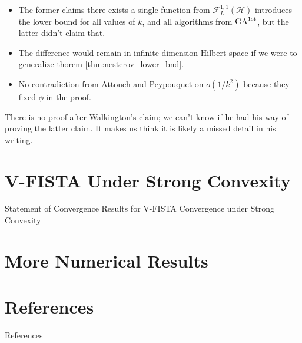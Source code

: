 \documentclass[11pt]{beamer}
\theoremstyle{definition}
\begin{document}
    \begin{frame}
        \begin{itemize}
            \item The former claims there exists a single function from $\mathcal F_{L}^{1,1}(\mathcal H)$ introduces the lower bound for all values of $k$, and all algorithms from $\text{GA}^{\text{1st}}$, but the latter didn't claim that. 
            \item The difference would remain in infinite dimension Hilbert space if we were to generalize \hyperref[thm:nesterov_lower_bnd]{thorem \ref*{thm:nesterov_lower_bnd}}.
            \item No contradiction from Attouch and Peypouquet\cite{attouch_rate_2016} on $o(1/k^2)$ because they fixed $\phi$ in the proof. 
        \end{itemize}
        There is no proof after Walkington's claim; we can't know if he had his way of proving the latter claim. 
        It makes us think it is likely a missed detail in his writing. 
    \end{frame}
 

\section{V-FISTA Under Strong Convexity}
    \begin{frame}{Statement of Convergence Results for V-FISTA Convergence under Strong Convexity}
        
    \end{frame}

\section{More Numerical Results}

    
\section{References}
    \begin{frame}[allowframebreaks]{References}
        
        
    \end{frame}
\end{document}
